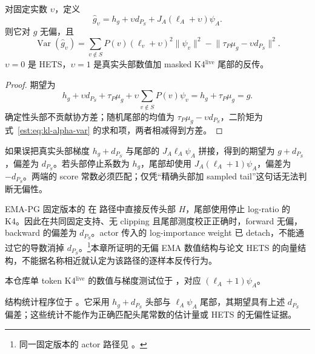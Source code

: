 \documentclass[lang=cn,scheme=chinese,openany]{../book/elegantbook}
\newcommand{\Var}{\operatorname{Var}}
\begin{document}
\begin{theorem}
对固定实数 $\upsilon$，定义
\begin{equation*}
 \widehat g_\upsilon
 =h_g+\upsilon d_{P_S}+J_A(\ell_A+\upsilon)\psi_A.
\end{equation*}
则它对 $g$ 无偏，且
\begin{equation}
 \Var(\widehat g_\upsilon)
 =\sum_{v\notin S}P(v)(\ell_v+\upsilon)^2\lVert \psi_v\rVert^2
  -\lVert\tau_P\mu_g-\upsilon d_{P_S}\rVert^2.
 \label{est:eq:kl-alpha-var}
\end{equation}
$\upsilon=0$ 是 HETS，$\upsilon=1$ 是真实头部数值加 masked K4$^{\mathrm{live}}$ 尾部的反传。
\end{theorem}

\begin{proof}
期望为
\begin{equation*}
 h_g+\upsilon d_{P_S}+\tau_P\mu_g+\upsilon\sum_{v\notin S}P(v)\psi_v
 =h_g+\tau_P\mu_g=g.
\end{equation*}
确定性头部不贡献协方差；随机尾部的均值为 $\tau_P\mu_g-\upsilon d_{P_S}$，二阶矩为式~\eqref{est:eq:kl-alpha-var} 的求和项，两者相减得到方差。
\end{proof}

如果误把真实头部梯度 $h_g+d_{P_S}$ 与尾部的 $J_A\ell_A\psi_A$ 拼接，得到的期望为 $g+d_{P_S}$，偏差为 $d_{P_S}$。若头部停止系数为 $h_g$，尾部却使用 $J_A(\ell_A+1)\psi_A$，偏差为 $-d_{P_S}$。两端的 score 常数必须匹配；仅凭“精确头部加 sampled tail”这句话无法判断无偏性。

EMA-PG 固定版本的  在  路径中直接反传头部 $H$，尾部使用停止 log-ratio 的 K4。因此在共同固定支持、无 clipping 且尾部测度校正正确时，forward 无偏，backward 的偏差为 $d_{P_S}$。actor 传入的 log-importance weight 已 detach，不能通过它的导数消掉 $d_{P_S}$。\footnote{同一固定版本的 actor 路径见 \href{https://github.com/LunjunZhang/ema-pg/blob/f9b977632ad948ce935432a517c22291bfaba562/search/verl/workers/actor/dp_actor.py}{}。}本章所证明的无偏 EMA 数值结构与论文 HETS 的向量结构，不能据名称相近就认定为该路径的逐样本反传行为。

本仓库单 token K4$^{\mathrm{live}}$ 的数值与梯度测试位于 ，对应 $(\ell_A+1)\psi_A$。

结构统计程序位于 。它采用 $h_g+d_{P_S}$ 头部与 $\ell_A\psi_A$ 尾部，其期望具有上述 $d_{P_S}$ 偏差；这些统计不能作为正确匹配头尾常数的估计量或 HETS 的无偏性证据。
\end{document}
